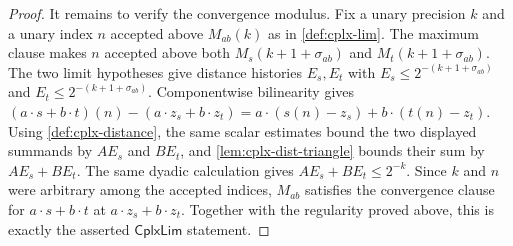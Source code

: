 \begin{proof}
It remains to verify the convergence modulus. Fix a unary precision $k$ and a unary index $n$ accepted above $M_{ab}(k)$ as in \autoref{def:cplx-lim}. The maximum clause makes $n$ accepted above both $M_s(k+1+\sigma_{ab})$ and $M_t(k+1+\sigma_{ab})$. The two limit hypotheses give distance histories $E_s,E_t$ with $E_s\leq 2^{-(k+1+\sigma_{ab})}$ and $E_t\leq 2^{-(k+1+\sigma_{ab})}$. Componentwise bilinearity gives $(a\cdot s+b\cdot t)(n)-(a\cdot z_s+b\cdot z_t)=a\cdot(s(n)-z_s)+b\cdot(t(n)-z_t)$. Using \autoref{def:cplx-distance}, the same scalar estimates bound the two displayed summands by $A E_s$ and $B E_t$, and \autoref{lem:cplx-dist-triangle} bounds their sum by $A E_s+B E_t$. The same dyadic calculation gives $A E_s+B E_t\leq 2^{-k}$. Since $k$ and $n$ were arbitrary among the accepted indices, $M_{ab}$ satisfies the convergence clause for $a\cdot s+b\cdot t$ at $a\cdot z_s+b\cdot z_t$. Together with the regularity proved above, this is exactly the asserted $\mathsf{CplxLim}$ statement.
\end{proof}
